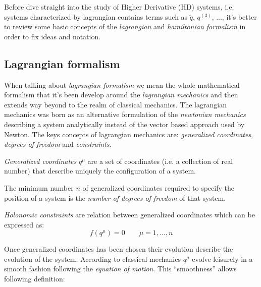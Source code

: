 Before dive straight into the study of Higher Derivative (HD) systems, i.e.
systems characterized by lagrangian contains terms such as $\ddot{q}$,
${q}^{(3)}$, ..., it's better to review some basic concepts of the
\emph{lagrangian} and \emph{hamiltonian formalism} in order to fix ideas and
notation.

\subsection{Lagrangian formalism}
When talking about \emph{lagrangian formalism} we mean the whole mathematical
formalism that it's been develop around the \emph{lagrangian mechanics} and then
extends way beyond to the realm of classical mechanics. The lagrangian mechanics
was born as an alternative formulation of the \emph{newtonian mechanics}
describing a system analytically instead of the vector based approach used by
Newton. The keys concepts of lagrangian mechanics are: \emph{generalized
coordinates}, \emph{degrees of freedom} and \emph{constraints}.

\begin{definition}\label{def: generalized coordinates} \cite{Ginsberg08}
  \emph{Generalized coordinates} $q^{\mu}$ are a set of coordinates (i.e. a
  collection of real number) that describe uniquely the configuration of a
  system.
\end{definition}

\begin{definition}\label{def: dof} \cite{Ginsberg08}
  The minimum number $n$ of generalized coordinates required to specify the
  position of a system is the \emph{number of degrees of freedom} of that
  system.
\end{definition}

\begin{definition}\label{def: holonomic constraints}
  \cite{Goldstein11_hol_constraints}
  \emph{Holonomic constraints} are relation between generalized coordinates which can
  be expressed as:
  \begin{equation*}
      f(q^{\mu}) = 0 \qquad \mu = 1, \ldots, n
  \end{equation*}
\end{definition}

Once generalized coordinates has been chosen their evolution describe the
evolution of the system. According to classical mechanics $q^{\mu}$ evolve
leisurely in a smooth fashion following the \emph{equation of motion}. This
``smoothness'' allows following definition:

